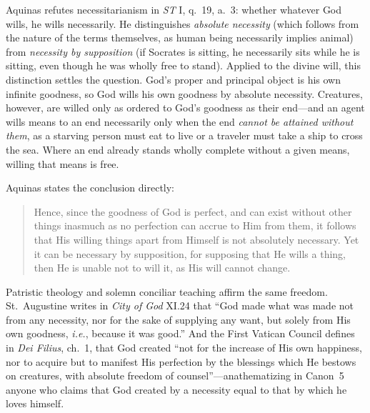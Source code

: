 Aquinas refutes necessitarianism in \emph{ST} I, q.\ 19, a.\ 3: whether whatever God wills, he wills necessarily. He distinguishes \emph{absolute necessity} (which follows from the nature of the terms themselves, as human being necessarily implies animal) from \emph{necessity by supposition} (if Socrates is sitting, he necessarily sits while he is sitting, even though he was wholly free to stand). Applied to the divine will, this distinction settles the question. God's proper and principal object is his own infinite goodness, so God wills his own goodness by absolute necessity. Creatures, however, are willed only as ordered to God's goodness as their end---and an agent wills means to an end necessarily only when the end \emph{cannot be attained without them}, as a starving person must eat to live or a traveler must take a ship to cross the sea. Where an end already stands wholly complete without a given means, willing that means is free.

Aquinas states the conclusion directly:

\begin{quote}
Hence, since the goodness of God is perfect, and can exist without other things inasmuch as no perfection can accrue to Him from them, it follows that His willing things apart from Himself is not absolutely necessary. Yet it can be necessary by supposition, for supposing that He wills a thing, then He is unable not to will it, as His will cannot change.
\end{quote}

Patristic theology and solemn conciliar teaching affirm the same freedom. St.\ Augustine writes in \emph{City of God} XI.24 that ``God made what was made not from any necessity, nor for the sake of supplying any want, but solely from His own goodness, \emph{i.e.}, because it was good.'' And the First Vatican Council defines in \emph{Dei Filius}, ch.\ 1, that God created ``not for the increase of His own happiness, nor to acquire but to manifest His perfection by the blessings which He bestows on creatures, with absolute freedom of counsel''---anathematizing in Canon~5 anyone who claims that God created by a necessity equal to that by which he loves himself.

